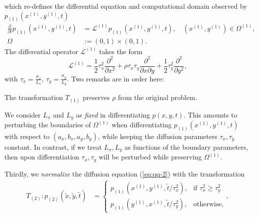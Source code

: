 which re-defines the differential equation and computational domain observed by
$p_{(1)}(x^{(1)}, y^{(1)}, t)$
\begin{align}
  \frac{\partial}{\partial t}p_{(1)}(x^{(1)}, y^{(1)}, t) &= \mathcal{L}^{(1)}p_{(1)}(x^{(1)}, y^{(1)}, t),\quad (x^{(1)},y^{(1)}) \in \Omega^{(1)}, \label{eq:qq-2} \\
  \Omega &:= (0,1) \times (0,1). \nonumber
\end{align}
The differential operator $\mathcal{L}^{(1)}$ takes the form
\[
  \mathcal{L}^{(1)} = \frac{1}{2} \tau_x^2 \frac{\partial^2}{\partial x^2}
  + \rho\tau_x\tau_y \frac{\partial^2}{\partial x \partial y} + \frac{1}{2}\tau_y^2 \frac{\partial^2}{\partial y^2},
\]
with $\tau_x = \frac{\sigma_x}{L_x}$,
$\tau_y = \frac{\sigma_y}{L_y}$.  Two remarks are in order here:
\begin{remark}
  The transformation $T_{(1)}$ preserves $\rho$ from the original problem.
\end{remark}
\begin{remark} \label{remark:const-L} We consider $L_x$ and $L_y$ as
  \textit{fixed} in differentiating $p(x,y,t)$. This amounts to
  perturbing the boundaries of $\Omega^{(1)}$ when differentiating
  $p_{(1)}(x^{(1)}, y^{(1)}, t)$ with respect to $(a_x, b_x, a_y, b_y)$,
  while keeping the diffusion parameters $\tau_x, \tau_y$
  constant. In contrast, if we treat $L_x, L_y$ as functions of the
  boundary parameters, then upon differentiation $\tau_x, \tau_y$ will
  be perturbed while preserving $\Omega^{(1)}$.
\end{remark}
Thirdly, we \textit{normalize} the diffusion equation (\ref{eq:qq-2}) with the transformation
\begin{align}
  T_{(2)}: p_{(2)}(\tilde{x}, \tilde{y}, \tilde{t}) &= \left\{ \begin{array}{cc}
                                                  p_{(1)}(x^{(1)}, y^{(1)}, \tilde{t}/\tau_x^2), &\mbox{if } \tau_x^2 \geq \tau_y^2 \\
                                                 p_{(1)}(y^{(1)}, x^{(1)}, \tilde{t}/\tau_y^2), &\mbox{otherwise},
                                                  \end{array} \right., \label{eq:T2}
\end{align}
